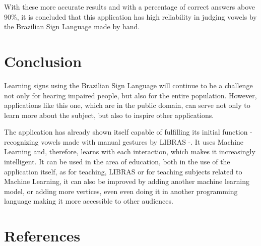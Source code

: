 \documentclass[a4paper, 12pt]{article}
\begin{document}
With these more accurate results and with a percentage of correct answers above 90\%, it is concluded that this application has high reliability in judging vowels by the Brazilian Sign Language made by hand.


\section{Conclusion}

Learning signs using the Brazilian Sign Language will continue to be a challenge not only for hearing impaired people, but also for the entire population. However, applications like this one, which are in the public domain, can serve not only to learn more about the subject, but also to inspire other applications.

The application has already shown itself capable of fulfilling its initial function - recognizing vowels made with manual gestures by LIBRAS -. It uses Machine Learning and, therefore, learns with each interaction, which makes it increasingly intelligent. It can be used in the area of education, both in the use of the application itself, as for teaching, LIBRAS or for teaching subjects related to Machine Learning, it can also be improved by adding another machine learning model, or adding more vertices, even even doing it in another programming language making it more accessible to other audiences.



\newpage
\section{References}
\end{document}
